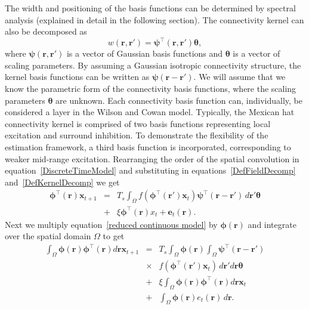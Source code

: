 \documentclass[12pt]{iopart}
\begin{document}
The width and positioning of the basis functions can be determined by spectral analysis (explained in detail in the following section). The connectivity kernel can also be decomposed as 
\begin{equation}\label{DefKernelDecomp}
	 w\left(\mathbf{r},\mathbf{r}'\right) =\boldsymbol{\psi}^\top\left(\mathbf{r},\mathbf{r}'\right) \boldsymbol{\theta},
\end{equation}
where $\boldsymbol{\psi}(\mathbf{r},\mathbf{r}')$ is a vector of Gaussian basis functions and $\boldsymbol{\theta}$ is a vector of scaling parameters. By assuming a Gaussian isotropic connectivity structure, the kernel basis functions can be written as $\boldsymbol{\psi}(\mathbf{r}-\mathbf{r}')$. We will assume that we know the parametric form of the connectivity basis functions, where the scaling parameters $\boldsymbol{\theta}$ are unknown. Each connectivity basis function can, individually, be considered a layer in the Wilson and Cowan model. Typically, the Mexican hat connectivity kernel is comprised of two basis functions representing local excitation and surround inhibition. To demonstrate the flexibility of the estimation framework, a third basis function is incorporated, corresponding to weaker mid-range excitation. Rearranging the order of the spatial convolution in equation~\ref{DiscreteTimeModel} and substituting in equations~\ref{DefFieldDecomp} and~\ref{DefKernelDecomp} we get 
\begin{eqnarray}
	\label{reduced continuous model}
	\boldsymbol{\phi}^{\top}(\mathbf{r})\mathbf{x}_{t+1} &=& T_s\int_\Omega{f(\boldsymbol{\phi}^{\top}(\mathbf{r}')\mathbf{x}_t )\boldsymbol{\psi}^{\top}(\mathbf{r}-\mathbf{r}') \, d\mathbf{r}'}\boldsymbol{\theta} \nonumber \\
	&+& \xi\boldsymbol{\phi}^{\top}(\mathbf{r})x_t + \mathbf{e}_t(\mathbf{r}). 
\end{eqnarray}
Next we multiply equation~\ref{reduced continuous model} by $\boldsymbol{\phi}(\mathbf{r})$ and integrate over the spatial domain $\Omega$ to get 
\begin{eqnarray}
	\label{StartofReduction}
 	\int_\Omega {\boldsymbol{\phi} \left(\mathbf{r}\right)\boldsymbol{\phi}^{\top}\left(\mathbf{r}\right) d\mathbf{r}} \mathbf{x}_{t+1} &=&
 T_s \int_\Omega \boldsymbol{\phi} (\mathbf{r}) \int_\Omega \boldsymbol{\psi}^{\top} (\mathbf{r}-\mathbf{r}') \nonumber \\
&\times& { f(\boldsymbol{\phi}^{\top}(\mathbf{r}') \mathbf{x}_t ) \, d\mathbf{r}'d\mathbf{r}}\boldsymbol{\theta} \nonumber \\ 
&+& \xi\int_\Omega {\boldsymbol{\phi}(\mathbf{r})\boldsymbol{\phi}^{\top}(\mathbf{r})d\mathbf{r}} \mathbf{x}_t \nonumber \\ &+& 
\int_\Omega{\boldsymbol{\phi} (\mathbf{r}) e_t(\mathbf{r}) \, d\mathbf{r}}. 
\end{eqnarray}
\end{document}

